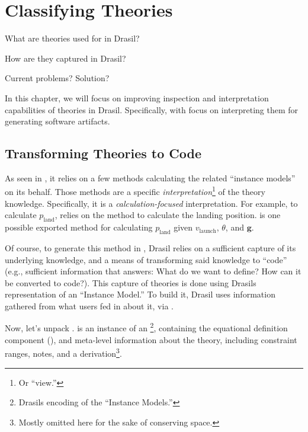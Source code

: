 \chapter{Classifying Theories}
\label{chap:modelkinds}

\begin{writingdirectives}
    \item What are theories used for in Drasil?
    \item How are they captured in Drasil?
    \item Current problems? Solution?
\end{writingdirectives}

In this chapter, we will focus on improving inspection and interpretation
capabilities of theories in Drasil. Specifically, with focus on interpreting
them for generating software artifacts.

\section{Transforming Theories to Code}
\label{chap:modelkinds:sec:transforming-theories-to-code}

As seen in , it relies on a few methods
calculating the related ``instance models'' on its behalf. Those methods are a
specific \textit{interpretation}\footnote{Or ``view.''} of the theory knowledge.
Specifically, it is a \textit{calculation-focused} interpretation. For example,
to calculate \(p_\text{land}\),  relies on the
method  to calculate the landing position.
 is one possible exported method for
calculating \(p_\text{land}\) given \(v_\text{launch}\), \(\theta\), and
\(\mathbf{g}\).

\originalJavaProjectilePLandMethod{}

Of course, to generate this method in ,
Drasil relies on a sufficient capture of its underlying knowledge, and a means
of transforming said knowledge to ``code'' (e.g., sufficient information that
answers: What do we want to define? How can it be converted to code?). This
capture of theories is done using Drasils representation of an ``Instance
Model.'' To build it, Drasil uses information gathered from what users fed in
about it, via .

\originalLandPosTheoryDefinition{}

Now, let's unpack .  is
an instance of an \InstanceModel{}\footnote{Drasils encoding of the ``Instance
    Models.''}, containing the equational definition component
(), and meta-level information about the theory, including
constraint ranges, notes, and a derivation\footnote{Mostly omitted here for the
    sake of conserving space.}.

